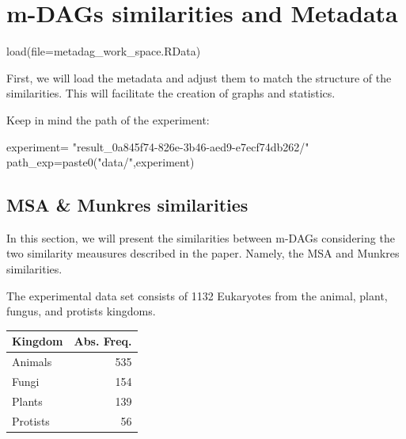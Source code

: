 \documentclass[
  letterpaper,
  DIV=11,
  numbers=noendperiod]{scrreprt}
\newenvironment{Shaded}{}{}
\newcommand{\AttributeTok}[1]{\textcolor[rgb]{0.78,0.47,0.87}{#1}}
\newcommand{\FunctionTok}[1]{\textcolor[rgb]{0.38,0.69,0.94}{#1}}
\newcommand{\NormalTok}[1]{\textcolor[rgb]{0.67,0.70,0.75}{#1}}
\newcommand{\OtherTok}[1]{\textcolor[rgb]{0.15,0.68,0.38}{#1}}
\newcommand{\StringTok}[1]{\textcolor[rgb]{0.60,0.76,0.47}{#1}}
\begin{document}

\hypertarget{m-dags-similarities-and-metadata}{%
\chapter{m-DAGs similarities and
Metadata}\label{m-dags-similarities-and-metadata}}

\begin{Shaded}
\begin{Highlighting}[]
\FunctionTok{load}\NormalTok{(}\AttributeTok{file=}\StringTok{\textquotesingle{}metadag\_work\_space.RData\textquotesingle{}}\NormalTok{)}
\end{Highlighting}
\end{Shaded}

First, we will load the metadata and adjust them to match the structure
of the similarities. This will facilitate the creation of graphs and
statistics.

Keep in mind the path of the experiment:

\begin{Shaded}
\begin{Highlighting}[]
\NormalTok{experiment}\OtherTok{=}
  \StringTok{"result\_0a845f74{-}826e{-}3b46{-}aed9{-}e7ecf74db262/"}
\NormalTok{path\_exp}\OtherTok{=}\FunctionTok{paste0}\NormalTok{(}\StringTok{"data/"}\NormalTok{,experiment)}
\end{Highlighting}
\end{Shaded}

\hypertarget{msa-munkres-similarities}{%
\section{MSA \& Munkres similarities}\label{msa-munkres-similarities}}

In this section, we will present the similarities between m-DAGs
considering the two similarity meausures described in the paper. Namely,
the MSA and Munkres similarities.

The experimental data set consists of 1132 Eukaryotes from the animal,
plant, fungus, and protists kingdoms.

\begin{tabular}{l|r}
\hline
Kingdom & Abs. Freq.\\
\hline
Animals & 535\\
\hline
Fungi & 154\\
\hline
Plants & 139\\
\hline
Protists & 56\\
\hline
\end{tabular}
\end{document}
